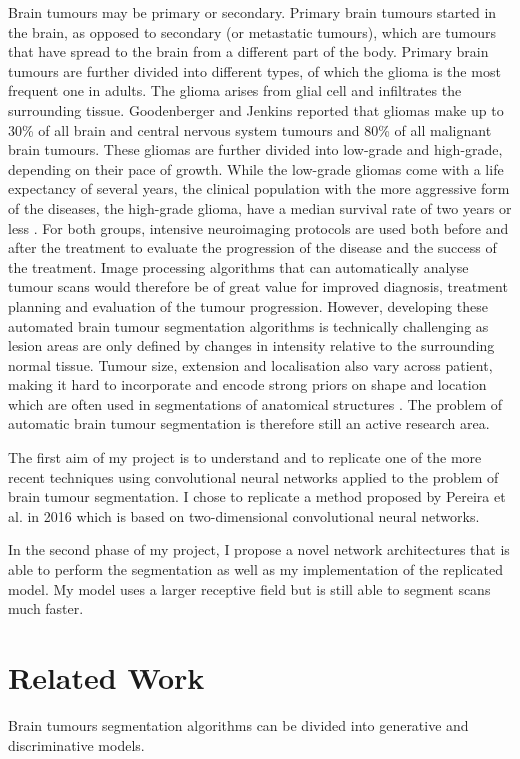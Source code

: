 \documentclass[12pt,a4paper,twoside,openright]{report}
\begin{document}
Brain tumours may be primary or secondary. Primary brain tumours started in the brain, as opposed to secondary (or metastatic tumours), which are tumours that have spread to the brain from a different part of the body. Primary brain tumours are further divided into different types, of which the glioma is the most frequent one in adults. The  glioma arises from glial cell and infiltrates the surrounding tissue. Goodenberger and Jenkins \cite{gliomas_research} reported that gliomas make up to 30\% of all brain and central nervous system tumours and 80\% of all malignant brain tumours. These gliomas are further divided into low-grade and high-grade, depending on their pace of growth. While the low-grade gliomas come with a life expectancy of several years, the clinical population with the more aggressive form of the diseases, the high-grade glioma, have a median survival rate of two years or less \cite{gliomas_life_expectancy}. For both groups, intensive neuroimaging protocols are used both before and after the treatment to evaluate the progression of the disease and the success of the treatment. Image processing algorithms that can automatically analyse tumour scans would therefore be of great value for improved diagnosis, treatment planning and evaluation of the tumour progression. However, developing these automated brain tumour segmentation algorithms is technically challenging as lesion areas are only defined by changes in intensity relative to the surrounding normal tissue. Tumour size, extension and localisation also vary across patient, making it hard to incorporate and encode strong priors on shape and location which are often used in segmentations of anatomical structures \cite{brats-proceedings}. The problem of automatic brain tumour segmentation is therefore still an active research area. 

The first aim of my project is to understand and to replicate one of the more recent techniques using convolutional neural networks applied to the problem of brain tumour segmentation. I chose to replicate a method proposed by Pereira et al.\cite{pereira} in 2016 which is based on two-dimensional convolutional neural networks. 

In the second phase of my project, I propose a novel network architectures that is able to perform the segmentation as well as my implementation of the replicated model. My model uses a larger receptive field but is still able to segment scans much faster.

\section{Related Work}
Brain tumours segmentation algorithms can be divided into generative and discriminative models.
\end{document}
